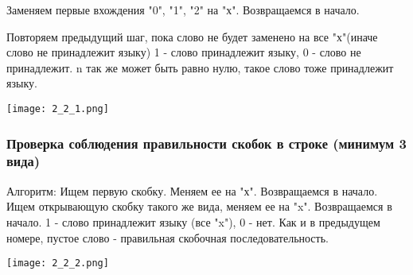 \documentclass{article}
\begin{document}
Заменяем первые вхождения "0", "1", "2" на "х". Возвращаемся в начало.

Повторяем предыдущий шаг, пока слово не будет заменено на все "х"(иначе слово не принадлежит языку)
1 - слово принадлежит языку, 0 - слово не принадлежит. n так же может быть равно нулю, такое слово тоже принадлежит языку.

\texttt{[image: 2\_2\_1.png]}
\newpage
\subsubsection{Проверка соблюдения правильности скобок в строке (минимум 3 вида) }

Алгоритм:
Ищем первую скобку. Меняем ее на "х". Возвращаемся в начало. Ищем открывающую скобку такого же вида, меняем ее на "x". Возвращаемся в начало. 1 - слово принадлежит языку (все "x"), 0 - нет. Как и в предыдущем номере, пустое слово - правильная скобочная последовательность.

\texttt{[image: 2\_2\_2.png]}
\end{document}

